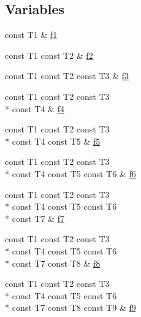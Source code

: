 \subsection*{Variables}
\begin{DoxyCompactItemize}
\item 
const T1 \& \hyperlink{namespacestd_1_1tr1_a9c0fa65b105f8e2f58ba59ecf75fd000}{f1}
\item 
const T1 const T2 \& \hyperlink{namespacestd_1_1tr1_a87dd9e009868361317f587126dba63d4}{f2}
\item 
const T1 const T2 const T3 \& \hyperlink{namespacestd_1_1tr1_a0f7c3b47d27d42d82d1a333ea420ce4e}{f3}
\item 
const T1 const T2 const T3 \\*
const T4 \& \hyperlink{namespacestd_1_1tr1_adc796e02b7385d526aff708189564f67}{f4}
\item 
const T1 const T2 const T3 \\*
const T4 const T5 \& \hyperlink{namespacestd_1_1tr1_a9c1eb66b2b2fa321942af95405232a0d}{f5}
\item 
const T1 const T2 const T3 \\*
const T4 const T5 const T6 \& \hyperlink{namespacestd_1_1tr1_a6b62f32e1e3e21bceb94eb46c4cbfd56}{f6}
\item 
const T1 const T2 const T3 \\*
const T4 const T5 const T6 \\*
const T7 \& \hyperlink{namespacestd_1_1tr1_a2185f3a1c07f2df072c39cb91ffa89a4}{f7}
\item 
const T1 const T2 const T3 \\*
const T4 const T5 const T6 \\*
const T7 const T8 \& \hyperlink{namespacestd_1_1tr1_ab998afa41cea8d6d26d7e4288b0bf974}{f8}
\item 
const T1 const T2 const T3 \\*
const T4 const T5 const T6 \\*
const T7 const T8 const T9 \& \hyperlink{namespacestd_1_1tr1_a216d2c7cdfaaf415caba2f88e2c34413}{f9}
\end{DoxyCompactItemize}


